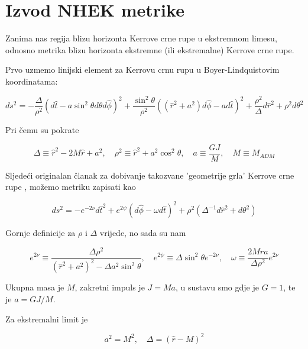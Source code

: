 \chapter{Izvod NHEK metrike}\label{cha:izvodNHEK}

Zanima nas regija blizu horizonta Kerrove crne rupe u ekstremnom limesu, odnosno metrika blizu horizonta ekstremne (ili ekstremalne) Kerrove crne rupe.

\noindent Prvo uzmemo linijski element za Kerrovu crnu rupu u Boyer-Lindquistovim koordinatama:

\begin{equation}
ds^2=-\frac{\Delta}{\rho^2}\left(d\hat{t}-a\sin^2\theta d\theta d\hat{\phi}\right)^2+\frac{\sin^2\theta}{\rho^2}\left(\left(\hat{r}^2+a^2\right)d\hat{\phi}-a d\hat{t}\right)^2+\frac{\rho^2}{\Delta}d\hat{r}^2+\rho^2d\theta^2
\end{equation}

\noindent Pri čemu su pokrate

\begin{equation}
\Delta\equiv\hat{r}^2-2M\hat{r}+a^2,\quad \rho^2\equiv\hat{r}^2+a^2\cos^2\theta,\quad a\equiv\frac{G J}{M},\quad M\equiv M_{ADM}
\end{equation}

\noindent Sljedeći originalan članak za dobivanje takozvane 'geometrije grla' Kerrove crne rupe \citep{Bardeen:1999px}, možemo metriku zapisati kao

\begin{equation}
ds^2=-e^{-2\nu}d\hat{t}^2+e^{2\psi}(d\hat{\phi}-\omega d\hat{t})^2+\rho^2\left(\Delta^{-1}d\hat{r}^2+d\theta^2\right)
\label{eq:BarHormetric}
\end{equation}

\noindent Gornje definicije za $\rho$ i $\Delta$ vrijede, no sada su nam 

\begin{equation}
e^{2\nu}\equiv\frac{\Delta\rho^2}{(\hat{r}^2+a^2)^2-\Delta a^2\sin^2\theta},\quad e^{2\psi}\equiv\Delta\sin^2\theta e^{-2\nu},\quad \omega\equiv\frac{2M\hat{r}a}{\Delta\rho^2}e^{2\nu}
\end{equation}

\noindent Ukupna masa je $M$, zakretni impuls je $J=Ma$, u sustavu smo gdje je $G=1$, te je $a=GJ/M$.

\noindent Za ekstremalni limit je 

\begin{equation}
a^2=M^2,\quad \Delta=(\hat{r}-M)^2
\end{equation}

